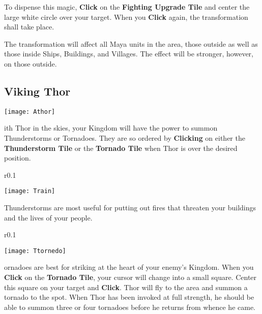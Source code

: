 To dispense this magic, \textbf{Click} on the \textbf{Fighting Upgrade Tile} and center the large white circle over your target. When you \textbf{Click} again, the transformation shall take place.

The transformation will affect all Maya units in the area, those outside as well as those inside Ships, Buildings, and Villages. The effect will be stronger, however, on those outside.

\subsection{\textsf{Viking Thor}}


\begin{center}
    \texttt{[image: Athor]}
\end{center}

ith Thor in the skies, your Kingdom will have the power to summon Thunderstorms or Tornadoes. They are so ordered by \textbf{Clicking} on either the \textbf{Thunderstorm Tile} or the \textbf{Tornado Tile} when Thor is over the desired position.

\begin{wrapfigure}{r}{0.1\textwidth}
    \vspace{-20pt}
    \begin{center}
        \texttt{[image: Train]}
    \end{center}
    \vspace{-20pt}
\end{wrapfigure}

Thunderstorms are most useful for putting out fires that threaten your buildings and the lives of your people. \\

\begin{wrapfigure}{r}{0.1\textwidth}
    \vspace{-20pt}
    \begin{center}
        \texttt{[image: Ttornedo]}
    \end{center}
    \vspace{-20pt}
\end{wrapfigure}

ornadoes are best for striking at the heart of your enemy’s Kingdom. When you \textbf{Click} on the \textbf{Tornado Tile}, your cursor will change into a small square. Center this square on your target and \textbf{Click}. Thor will fly to the area and summon a tornado to the spot. When Thor has been invoked at full strength, he should be able to summon three or four tornadoes before he returns from whence he came.

